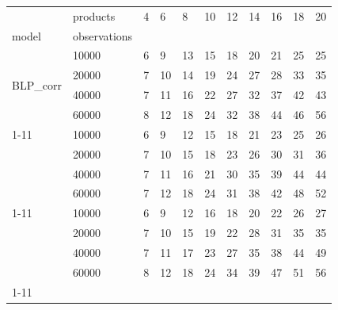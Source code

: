 \begin{tabular}{lllllllllll}
\toprule
 & products & 4 & 6 & 8 & 10 & 12 & 14 & 16 & 18 & 20 \\
model & observations &  &  &  &  &  &  &  &  &  \\
\midrule
\multirow[t]{4}{*}{BLP_corr} & 10000 & 6 & 9 & 13 & 15 & 18 & 20 & 21 & 25 & 25 \\
 & 20000 & 7 & 10 & 14 & 19 & 24 & 27 & 28 & 33 & 35 \\
 & 40000 & 7 & 11 & 16 & 22 & 27 & 32 & 37 & 42 & 43 \\
 & 60000 & 8 & 12 & 18 & 24 & 32 & 38 & 44 & 46 & 56 \\
\cline{1-11}
\multirow[t]{4}{*}{BLP_ind} & 10000 & 6 & 9 & 12 & 15 & 18 & 21 & 23 & 25 & 26 \\
 & 20000 & 7 & 10 & 15 & 18 & 23 & 26 & 30 & 31 & 36 \\
 & 40000 & 7 & 11 & 16 & 21 & 30 & 35 & 39 & 44 & 44 \\
 & 60000 & 7 & 12 & 18 & 24 & 31 & 38 & 42 & 48 & 52 \\
\cline{1-11}
\multirow[t]{4}{*}{Logit} & 10000 & 6 & 9 & 12 & 16 & 18 & 20 & 22 & 26 & 27 \\
 & 20000 & 7 & 10 & 15 & 19 & 22 & 28 & 31 & 35 & 35 \\
 & 40000 & 7 & 11 & 17 & 23 & 27 & 35 & 38 & 44 & 49 \\
 & 60000 & 8 & 12 & 18 & 24 & 34 & 39 & 47 & 51 & 56 \\
\cline{1-11}
\bottomrule
\end{tabular}
